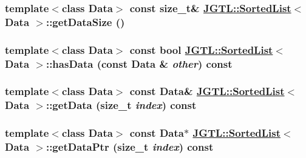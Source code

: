 \hypertarget{class_j_g_t_l_1_1_sorted_list_a91c989bf22b3ac5d25c00f5a36389c5}{
\subsubsection[getDataSize]{\setlength{\rightskip}{0pt plus 5cm}template$<$class Data$>$ const size\_\-t\& \hyperlink{class_j_g_t_l_1_1_sorted_list}{JGTL::Sorted\-List}$<$ Data $>$::get\-Data\-Size ()}}
\label{class_j_g_t_l_1_1_sorted_list_a91c989bf22b3ac5d25c00f5a36389c5}


\hypertarget{class_j_g_t_l_1_1_sorted_list_8acf88bdfe7f74a11e4c2dc945ec165d}{
\subsubsection[hasData]{\setlength{\rightskip}{0pt plus 5cm}template$<$class Data$>$ const bool \hyperlink{class_j_g_t_l_1_1_sorted_list}{JGTL::Sorted\-List}$<$ Data $>$::has\-Data (const Data \& {\em other}) const}}
\label{class_j_g_t_l_1_1_sorted_list_8acf88bdfe7f74a11e4c2dc945ec165d}


\hypertarget{class_j_g_t_l_1_1_sorted_list_2c2b54845e1d3fb62c70e2a60c322b35}{
\subsubsection[getData]{\setlength{\rightskip}{0pt plus 5cm}template$<$class Data$>$ const Data\& \hyperlink{class_j_g_t_l_1_1_sorted_list}{JGTL::Sorted\-List}$<$ Data $>$::get\-Data (size\_\-t {\em index}) const}}
\label{class_j_g_t_l_1_1_sorted_list_2c2b54845e1d3fb62c70e2a60c322b35}


\hypertarget{class_j_g_t_l_1_1_sorted_list_c5d2b01457f3769e028afd5343685082}{
\subsubsection[getDataPtr]{\setlength{\rightskip}{0pt plus 5cm}template$<$class Data$>$ const Data$\ast$ \hyperlink{class_j_g_t_l_1_1_sorted_list}{JGTL::Sorted\-List}$<$ Data $>$::get\-Data\-Ptr (size\_\-t {\em index}) const}}
\label{class_j_g_t_l_1_1_sorted_list_c5d2b01457f3769e028afd5343685082}




